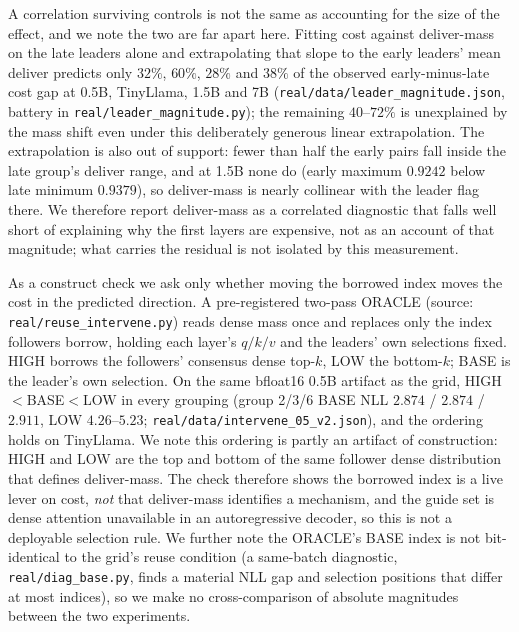 \documentclass[10pt]{article}
\begin{document}
A correlation surviving controls is not the same as accounting for the size of
the effect, and we note the two are far apart here. Fitting cost against
deliver-mass on the late leaders alone and extrapolating that slope to the early
leaders' mean deliver predicts only $32\%$, $60\%$, $28\%$ and $38\%$ of the
observed early-minus-late cost gap at 0.5B, TinyLlama, 1.5B and 7B
(\texttt{real/data/leader\_magnitude.json}, battery in
\texttt{real/leader\_magnitude.py}); the remaining $40$--$72\%$ is unexplained by
the mass shift even under this deliberately generous linear extrapolation. The
extrapolation is also out of support: fewer than half the early pairs fall inside
the late group's deliver range, and at 1.5B none do (early maximum $0.9242$ below
late minimum $0.9379$), so deliver-mass is nearly collinear with the leader flag
there. We therefore report deliver-mass as a correlated diagnostic that falls
well short of explaining why the first layers are expensive, not as an account of
that magnitude; what carries the residual is not isolated by this measurement.

As a construct check we ask only whether moving the borrowed index moves the
cost in the predicted direction. A pre-registered two-pass ORACLE
(source: \texttt{real/reuse\_intervene.py}) reads dense mass once and replaces
only the index followers borrow, holding each layer's $q/k/v$ and the leaders'
own selections fixed. HIGH borrows the followers' consensus dense top-$k$,
LOW the bottom-$k$; BASE is the leader's own selection. On the same bfloat16
0.5B artifact as the grid, HIGH$<$BASE$<$LOW in every grouping (group 2/3/6
BASE NLL $2.874$ / $2.874$ / $2.911$, LOW $4.26$--$5.23$;
\texttt{real/data/intervene\_05\_v2.json}), and the ordering holds on
TinyLlama. We note this ordering is partly an artifact of construction: HIGH
and LOW are the top and bottom of the same follower dense distribution that
defines deliver-mass. The check therefore shows the borrowed index is a live lever on
cost, \emph{not} that deliver-mass identifies a mechanism, and the guide set is
dense attention unavailable in an autoregressive decoder, so this is not a
deployable selection rule. We further note the ORACLE's BASE index is not
bit-identical to the grid's reuse condition (a same-batch diagnostic,
\texttt{real/diag\_base.py}, finds a material NLL gap and selection positions
that differ at most indices), so we make no cross-comparison of absolute
magnitudes between the two experiments.
\end{document}
